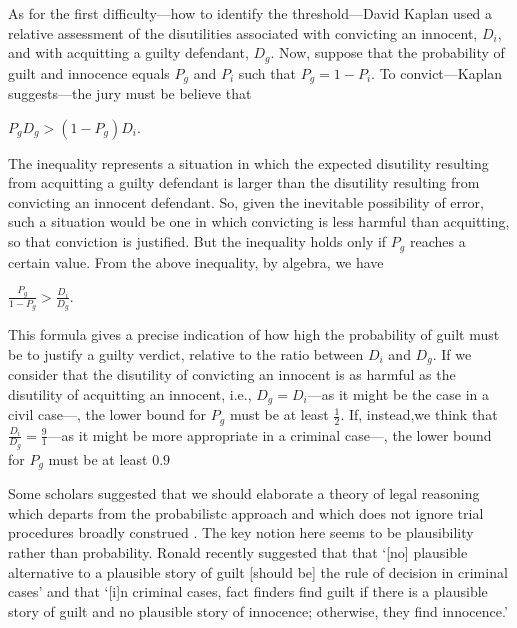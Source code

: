 \documentclass[10pt]{article}
\begin{document}
As for the first difficulty---how to identify the threshold---David Kaplan used a relative assessment 
of the disutilities associated with convicting an innocent, $D_i$, and with acquitting a guilty defendant, $D_g$.  
Now, suppose that the probability of guilt 
and innocence equals $P_g$ and $P_i$ such that $P_g = 1 - P_i$. 
To convict---Kaplan suggests---the jury must be believe that 

\vspace{2mm}

$P_g D_g > (1-P_g) D_i$.

\vspace{2mm}
\noindent
The inequality represents a situation in which the expected disutility resulting 
from acquitting a guilty defendant is larger than the disutility resulting from 
convicting an innocent defendant. So, given the inevitable possibility of error, such a situation would be one in which 
convicting is less harmful than acquitting, so that conviction is justified.
But the inequality holds only if $P_g$ reaches a certain value. 
From the above inequality, by algebra, we have

\vspace{2mm}
$\frac{P_g}{1- P_g} > \frac{D_i}{D_g}$.

\vspace{2mm}
\noindent
This formula gives a precise indication of how high the probability 
of guilt must be to justify a guilty verdict, relative to the ratio between $D_i$ and $D_g$. If we consider that
the disutility of convicting an innocent is as harmful as the disutility of acquitting an innocent, 
i.e., $D_g=D_i$---as it might be the case in a civil case---, the lower bound for $P_g$ must be at least $\frac{1} {2}$. 
If, instead,we think that $\frac{D_i}{D_g}=\frac{9}{1}$---as it might be more appropriate in a criminal 
case---, the lower bound for $P_g$ must be at least $0.9$

Some scholars suggested that we should elaborate a 
theory of legal reasoning which departs from the 
probabilistc approach and which does not ignore trial procedures broadly construed
\citep{cohen77, nesson79, Thomson86, Walton2002, Stein05, Pardo2008Judicial-Proof-, ho08, Haack2011Legal-Probabili}.
The key notion here seems to be plausibility rather than probability.
Ronald \cite{Allen2010No-Plausible-Al} recently suggested that that 
`[no] plausible alternative to a plausible story of guilt [should be] the rule of decision in criminal cases'
and that `[i]n criminal cases, fact finders find guilt if there is a plausible story of guilt and 
no plausible story of innocence; otherwise, they find innocence.'
\end{document}
